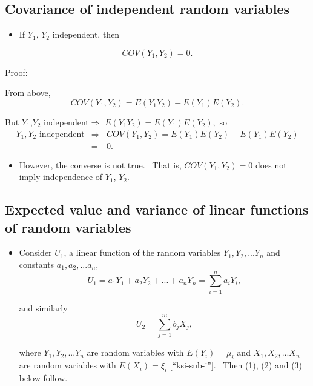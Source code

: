 \documentclass[11pt]{article}
\begin{document}
\subsection{Covariance of independent random variables\protect\bigskip}

\begin{itemize}
\item If $Y_{1}$, $Y_{2}$ independent, then
\end{itemize}

\begin{equation*}
COV(Y_{1},Y_{2})=0.
\end{equation*}

Proof: \ 

From above,%
\begin{equation*}
COV(Y_{1},Y_{2})=E(Y_{1}Y_{2})-E(Y_{1})E(Y_{2}).
\end{equation*}

But $Y_{1}$,$Y_{2}$ independent$\Rightarrow $ $%
E(Y_{1}Y_{2})=E(Y_{1})E(Y_{2}),$ so%
\begin{eqnarray*}
Y_{1},Y_{2}\text{ independent} &\Rightarrow
&COV(Y_{1},Y_{2})=E(Y_{1})E(Y_{2})-E(Y_{1})E(Y_{2}) \\
&=&0.
\end{eqnarray*}

\begin{itemize}
\item However, the converse is not true. \ That is, $COV(Y_{1},Y_{2})=0$
does not imply independence of $Y_{1}$, $Y_{2}$.\bigskip
\end{itemize}

\subsection{Expected value and variance of linear functions of random variables%
\protect\bigskip}

\begin{itemize}
\item Consider $U_{1}$, a linear function of the random variables $%
Y_{1},Y_{2},...Y_{n}$ and constants $a_{1},a_{2},...a_{n}$,%
\begin{equation*}
U_{1}=a_{1}Y_{1}+a_{2}Y_{2}+...+a_{n}Y_{n}=\sum_{i=1}^{n}a_{i}Y_{i},
\end{equation*}

and similarly%
\begin{equation*}
U_{2}=\sum_{j=1}^{m}b_{j}X_{j},
\end{equation*}

where $Y_{1},Y_{2},...Y_{n}$ are random variables with $E(Y_{i})=\mu _{i}$
and $X_{1},X_{2},...X_{n}$ are random variables with $E(X_{i})=\xi _{i}$
[\textquotedblleft ksi-sub-i\textquotedblright ]. \ Then (1), (2) and (3)
below follow.\bigskip
\end{itemize}
\end{document}
